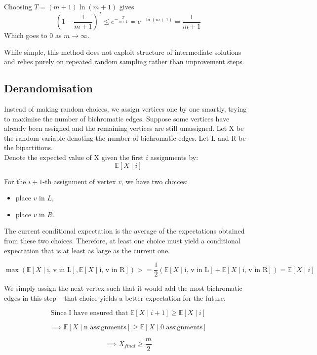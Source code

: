 \documentclass[11pt,openany]{book}
\begin{document}
\noindent Choosing $T=(m+1)\ln(m+1)$ gives
\[
(1-\frac{1}{m+1})^T
\le
e^{-\frac{T}{m+1}}
=
e^{-\ln(m+1)}
=
\frac{1}{m+1}
\]
Which goes to 0 as $m\to\infty$.

While simple, this method does not exploit structure of intermediate solutions and relies purely on repeated random sampling rather than improvement steps.

\subsection{Derandomisation}

Instead of making random choices, we assign vertices one by one 
smartly, trying to maximise the number of bichromatic edges.
Suppose some vertices have already been assigned and the remaining vertices are
still unassigned. Let X be the random variable denoting the number of bichromatic edges.
Let L and R be the bipartitions.\\


Denote the expected value of X given the first \(i\) assignments by:
\[
\mathbb E[X \mid i]
\]


For the $i+1$-th assignment of vertex \(v\), we have two choices:
\begin{itemize}
\item place \(v\) in \(L\),
\item place \(v\) in \(R\).
\end{itemize}

The current conditional expectation is the average of the expectations obtained
from these two choices. Therefore, at least one choice must yield a conditional
expectation that is at least as large as the current one.

\[
\max \left( \mathbb E[X \mid \text{i, v in L}], \mathbb E[X \mid \text{i, v in R}] \right) >= \frac{1}{2} \left(\mathbb E[X \mid \text{i, v in L}] + \mathbb E[X \mid \text{i, v in R}] \right) = \mathbb E[X \mid i]
\]


We simply assign the next vertex such that it would add the most 
bichromatic edges in this step -- that choice yields a better expectation for the future.
\vspace{0.5em}

\[
\text{Since I have ensured that }\mathbb E[X \mid i+1] \ge \mathbb E[X \mid i]
\]

\[
\implies \mathbb E[X \mid \text{n assignments}] \ge \mathbb E[X \mid \text{0 assignments}]
\]

\[
\implies X_{final} \ge \frac{m}{2}
\]
\end{document}
